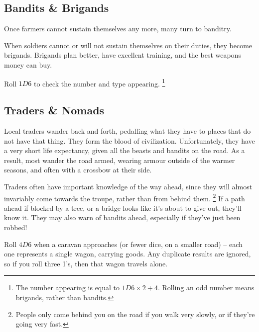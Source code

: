 \begin{multicols}{2}
\clearpage

\subsection{Bandits \& Brigands}

Once farmers cannot sustain themselves any more, many turn to banditry.

When soldiers cannot or will not sustain themselves on their duties, they become brigands.
Brigands plan better, have excellent training, and the best weapons money can buy.

Roll $1D6$ to check the number and type appearing.%
\footnote{The number appearing is equal to $1D6\times 2 + 4$.
Rolling an odd number means brigands, rather than bandits.}

\encBandits

\subsection{Traders \& Nomads}

Local traders wander back and forth, pedalling what they have to places that do not have that thing.
They form the blood of civilization.
Unfortunately, they have a very short life expectancy, given all the beasts and bandits on the road.
As a result, most wander the road armed, wearing armour outside of the warmer seasons, and often with a crossbow at their side.

Traders often have important knowledge of the way ahead, since they will almost invariably come towards the troupe, rather than from behind them.%
\footnote{People only come behind you on the road if you walk very slowly, or if they're going very fast.}
If a path ahead if blocked by a tree, or a bridge looks like it's about to give out, they'll know it.
They may also warn of bandits ahead, especially if they've just been robbed!

Roll $4D6$ when a caravan approaches (or fewer dice, on a smaller road) -- each one represents a single wagon, carrying goods.
Any duplicate results are ignored, so if you roll three 1's, then that wagon travels alone.

\encTraders

\end{multicols}

